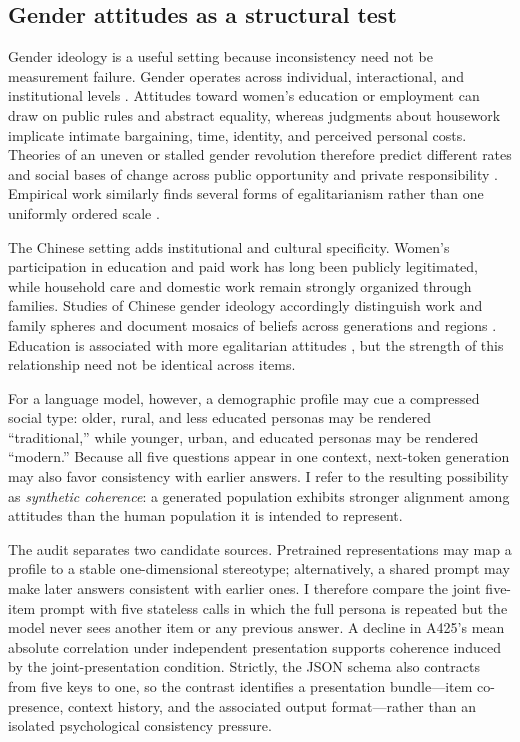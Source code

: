 \documentclass[11pt]{article}
\begin{document}
\subsection{Gender attitudes as a structural test}

Gender ideology is a useful setting because inconsistency need not be measurement failure. Gender operates across individual, interactional, and institutional levels \citep{risman2004gender}. Attitudes toward women's education or employment can draw on public rules and abstract equality, whereas judgments about housework implicate intimate bargaining, time, identity, and perceived personal costs. Theories of an uneven or stalled gender revolution therefore predict different rates and social bases of change across public opportunity and private responsibility \citep{england2010gender}. Empirical work similarly finds several forms of egalitarianism rather than one uniformly ordered scale \citep{knight2017egalitarianism,scarborough2019attitudes}.

The Chinese setting adds institutional and cultural specificity. Women's participation in education and paid work has long been publicly legitimated, while household care and domestic work remain strongly organized through families. Studies of Chinese gender ideology accordingly distinguish work and family spheres and document mosaics of beliefs across generations and regions \citep{qian2020separating,yang2023mosaic}. Education is associated with more egalitarian attitudes \citep{shu2004education}, but the strength of this relationship need not be identical across items.

For a language model, however, a demographic profile may cue a compressed social type: older, rural, and less educated personas may be rendered ``traditional,'' while younger, urban, and educated personas may be rendered ``modern.'' Because all five questions appear in one context, next-token generation may also favor consistency with earlier answers. I refer to the resulting possibility as \emph{synthetic coherence}: a generated population exhibits stronger alignment among attitudes than the human population it is intended to represent.

The audit separates two candidate sources. Pretrained representations may map a profile to a stable one-dimensional stereotype; alternatively, a shared prompt may make later answers consistent with earlier ones. I therefore compare the joint five-item prompt with five stateless calls in which the full persona is repeated but the model never sees another item or any previous answer. A decline in A425's mean absolute correlation under independent presentation supports coherence induced by the joint-presentation condition. Strictly, the JSON schema also contracts from five keys to one, so the contrast identifies a presentation bundle---item co-presence, context history, and the associated output format---rather than an isolated psychological consistency pressure.
\end{document}
